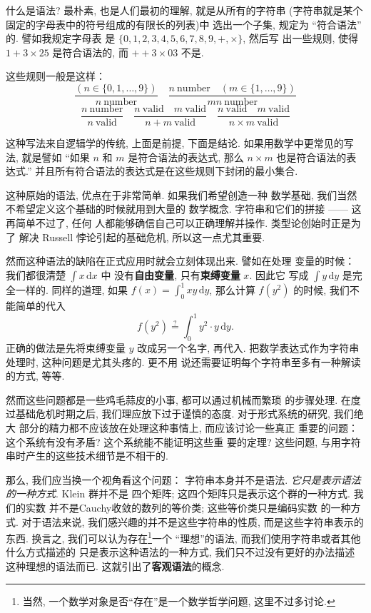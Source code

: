 \documentclass[UTF8]{ctexbook}
\theoremstyle{plain}
\theoremstyle{definition}
\theoremstyle{remark}
\begin{document}
什么是语法? 最朴素, 也是人们最初的理解, 就是从所有的字符串
(字符串就是某个固定的字母表中的符号组成的有限长的列表)中
选出一个子集, 规定为 “符合语法” 的. 譬如我规定字母表
是 \(\{0,1,2,3,4,5,6,7,8,9,+,\times\}\), 然后写
出一些规则, 使得 \(1 + 3 \times 25\) 是符合语法的,
而 \(++3\times 03\) 不是.

这些规则一般是这样：
\[
\frac{(n \in \{0,1,\dots,9\})}{n~\textrm{number}}\quad
\frac{n~\textrm{number}\quad (m \in \{1,\dots,9\})}{mn~\textrm{number}}
\]
\[
\frac{n~\text{number}}{n~\text{valid}}\quad
\frac{n~\text{valid}\quad m~\text{valid}}{n+m~\text{valid}}\quad
\frac{n~\text{valid}\quad m~\text{valid}}{n\times m~\text{valid}}
\]

这种写法来自逻辑学的传统, 上面是前提, 下面是结论.
如果用数学中更常见的写法, 就是譬如
“如果 \(n\) 和 \(m\) 是符合语法的表达式, 那么
\(n \times m\) 也是符合语法的表达式.”
并且所有符合语法的表达式是在这些规则下封闭的最小集合.

这种原始的语法, 优点在于非常简单. 如果我们希望创造一种
数学基础, 我们当然不希望定义这个基础的时候就用到大量的
数学概念. 字符串和它们的拼接 ------ 这再简单不过了, 任何
人都能够确信自己可以正确理解并操作. 类型论创始时正是为了
解决 Russell 悖论引起的基础危机, 所以这一点尤其重要.

然而这种语法的缺陷在正式应用时就会立刻体现出来. 譬如在处理
变量的时候： 我们都很清楚 \(\int x \,\mathrm dx\) 中
没有\textbf{自由变量}, 只有\textbf{束缚变量} \(x\). 因此它
写成 \(\int y \,\mathrm dy\) 是完全一样的. 同样的道理,
如果 \(f(x) = \int_0^1 xy \,\mathrm dy\), 那么计算
\(f(y^2)\) 的时候, 我们不能简单的代入
\[f(y^2) \stackrel?= \int_0^1 y^2 \cdot y\,\mathrm dy.\]
正确的做法是先将束缚变量 \(y\) 改成另一个名字, 再代入.
把数学表达式作为字符串处理时, 这种问题是尤其头疼的. 更不用
说还需要证明每个字符串至多有一种解读的方式, 等等.

然而这些问题都是一些鸡毛蒜皮的小事, 都可以通过机械而繁琐
的步骤处理. 在度过基础危机时期之后,
我们理应放下过于谨慎的态度. 对于形式系统的研究, 我们绝大
部分的精力都不应该放在处理这种事情上, 而应该讨论一些真正
重要的问题： 这个系统有没有矛盾? 这个系统能不能证明这些重
要的定理? 这些问题, 与用字符串时产生的这些技术细节是不相干的.

那么, 我们应当换一个视角看这个问题： 字符串本身并不是语法.
\emph{它只是表示语法的一种方式}. Klein 群并不是
四个矩阵; 这四个矩阵只是表示这个群的一种方式. 我们的实数
并不是Cauchy收敛的数列的等价类; 这些等价类只是编码实数
的一种方式. 对于语法来说, 我们感兴趣的并不是这些字符串的性质,
而是这些字符串表示的东西. 换言之, 我们可以认为存在\footnote{当然,
一个数学对象是否“存在”是一个数学哲学问题, 这里不过多讨论.}一个
“理想”的语法, 而我们使用字符串或者其他什么方式描述的
只是表示这种语法的一种方式, 我们只不过没有更好的办法描述
这种理想的语法而已. 这就引出了\textbf{客观语法}的概念.
\end{document}
